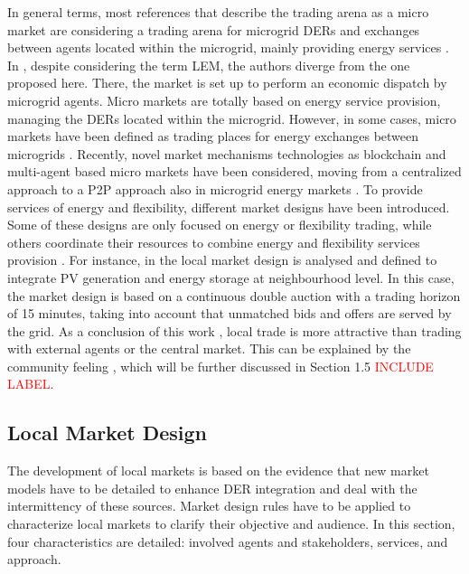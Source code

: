 In general terms, most references that describe the trading arena as a micro market are considering a trading arena for microgrid DERs and exchanges between agents located within the microgrid, mainly providing energy services \cite{faber2014micro, lane2013costing, block2008market, cox2011energy, sikdar2013microgrid, cui2014electricity, densmore2015energy, Heidari2018}. In \cite{shamsi2015economic}, despite considering the term LEM, the authors diverge from the one proposed here. There, the market is set up to perform an economic dispatch by microgrid agents. Micro markets are totally based on energy service provision, managing the DERs located within the microgrid. However, in some cases, micro markets have been defined as trading places for energy exchanges between microgrids \cite{menniti2014future}. Recently, novel market mechanisms technologies as blockchain and multi-agent based micro markets have been considered, moving from a centralized approach to a P2P approach also in microgrid energy markets \cite{Kounelis2017Fostering}. To provide services of energy and flexibility, different market designs have been introduced. Some of these designs are only focused on energy or flexibility trading, while others coordinate their resources to combine energy and flexibility services provision \cite{vytelingum2010trading, sikdar2013microgrid, Bayram2014}. For instance, in \cite{ampatzis2014local} the local market design is analysed and defined to integrate PV generation and energy storage at neighbourhood level. In this case, the market design is based on a continuous double auction with a trading horizon of 15 minutes, taking into account that unmatched bids and offers are served by the grid. As a conclusion of this work \cite{ampatzis2014local}, local trade is more attractive than trading with external agents or the central market. This can be explained by the community feeling \cite{Pinson2017}, which will be further discussed in Section 1.5 \textcolor{red}{INCLUDE LABEL}.

\subsection{Local Market Design}
The development of local markets is based on the evidence that new market models have to be detailed to enhance DER integration and deal with the intermittency of these sources. Market design rules have to be applied to characterize local markets to clarify their objective and audience. In this section, four characteristics are detailed: involved agents and stakeholders, services, and approach.

